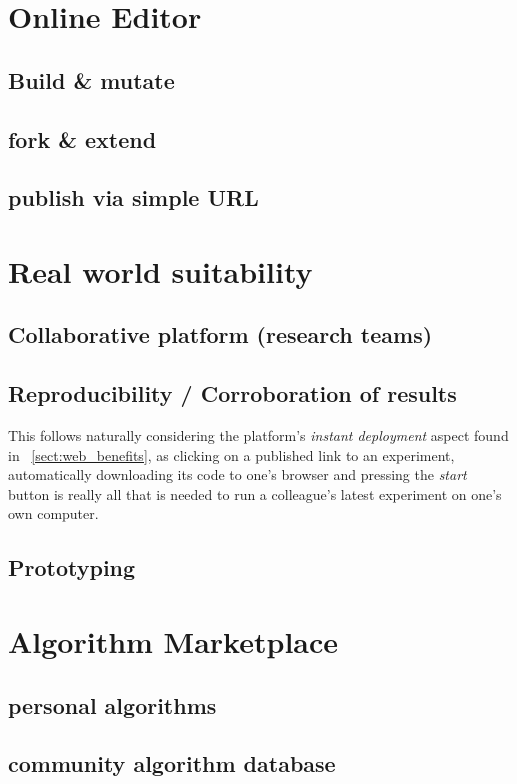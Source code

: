 \section{Online Editor}
\label{sect:online_editor}

	\subsection{Build \& mutate}
	\label{ssect: build_edit}
	
	\subsection{fork \& extend}
	\label{ssect: fork_extend}
	
	\subsection{publish via simple URL}
	\label{ssect: publish_url}



\section{Real world suitability}
\label{sect:realworld_suitability}

	\subsection{Collaborative platform (research teams)}
	\label{ssect:collaborative_platform}

	\subsection{Reproducibility / Corroboration of results}
	\label{ssect:reproducibility}
	This follows naturally considering the platform's \textit{instant deployment} aspect found in ~\ref{sect:web_benefits}, as clicking on a published link to an experiment, automatically downloading its code to one's browser and pressing the \textit{start} button is really all that is needed to run a colleague's latest experiment on one's own computer.
		
	\subsection{Prototyping}
	\label{ssect: prototyping}



\section{Algorithm Marketplace}
\label{sect:algo_marketplace}

\subsection{personal algorithms}
\label{ssect:algo_personal}

\subsection{community algorithm database}
\label{ssect:community_algo_db}


	